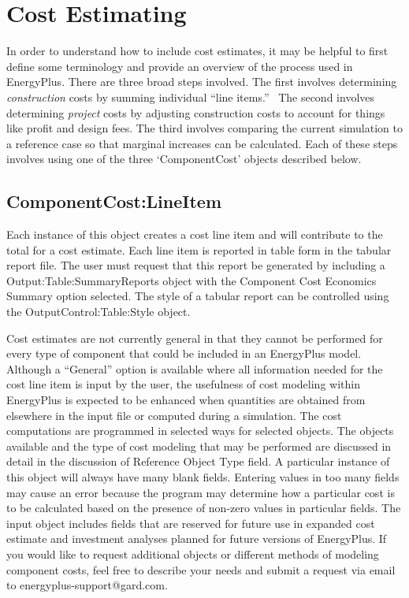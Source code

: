 \section{Cost Estimating}\label{cost-estimating}

In order to understand how to include cost estimates, it may be helpful to first define some terminology and provide an overview of the process used in EnergyPlus. There are three broad steps involved. The first involves determining \emph{construction} costs by summing individual ``line items.''~ The second involves determining \emph{project} costs by adjusting construction costs to account for things like profit and design fees. The third involves comparing the current simulation to a reference case so that marginal increases can be calculated. Each of these steps involves using one of the three `ComponentCost' objects described below.

\subsection{ComponentCost:LineItem}\label{componentcostlineitem}

Each instance of this object creates a cost line item and will contribute to the total for a cost estimate. Each line item is reported in table form in the tabular report file. The user must request that this report be generated by including a Output:Table:SummaryReports object with the Component Cost Economics Summary option selected. The style of a tabular report can be controlled using the OutputControl:Table:Style object.

Cost estimates are not currently general in that they cannot be performed for every type of component that could be included in an EnergyPlus model. Although a ``General'' option is available where all information needed for the cost line item is input by the user, the usefulness of cost modeling within EnergyPlus is expected to be enhanced when quantities are obtained from elsewhere in the input file or computed during a simulation. The cost computations are programmed in selected ways for selected objects. The objects available and the type of cost modeling that may be performed are discussed in detail in the discussion of Reference Object Type field. A particular instance of this object will always have many blank fields. Entering values in too many fields may cause an error because the program may determine how a particular cost is to be calculated based on the presence of non-zero values in particular fields. The input object includes fields that are reserved for future use in expanded cost estimate and investment analyses planned for future versions of EnergyPlus. If you would like to request additional objects or different methods of modeling component costs, feel free to describe your needs and submit a request via email to energyplus-support@gard.com.

